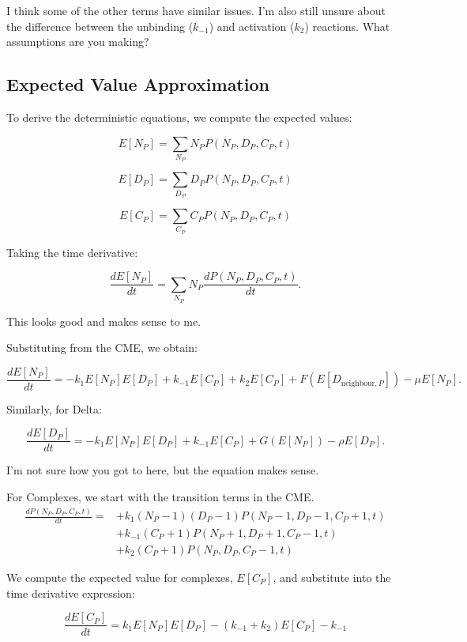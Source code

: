 \documentclass{article}
\begin{document}
\medskip

I think some of the other terms have similar issues. I'm also still unsure about the difference between the unbinding ($k_{-1}$) and activation ($k_{2}$) reactions. What assumptions are you making?

\color{black}


\subsection{Expected Value Approximation}
To derive the deterministic equations, we compute the expected values:

\[
E[N_P] = \sum_{N_P} N_P P(N_P, D_P, C_P, t)
\]

\[
E[D_P] = \sum_{D_P} D_P P(N_P, D_P, C_P, t)
\]

\[
E[C_P] = \sum_{C_P} C_P P(N_P, D_P, C_P, t)
\]

Taking the time derivative:

\[
\frac{dE[N_P]}{dt} = \sum_{N_P} N_P \frac{dP(N_P, D_P, C_P, t)}{dt}.
\]

\medskip
\color{red}
This looks good and makes sense to me.
\color{black}
\medskip

Substituting from the CME, we obtain:

\[
\frac{dE[N_P]}{dt} = -k_1 E[N_P]E[D_P] + k_{-1}E[C_P] + k_2 E[C_P] + F(E[D_{\text{neighbour},P}]) - \mu E[N_P].
\]

Similarly, for Delta:

\[
\frac{dE[D_P]}{dt} = -k_1 E[N_P]E[D_P] + k_{-1}E[C_P] + G(E[N_P]) - \rho E[D_P].
\]

\medskip
\color{red}
I'm not sure how you got to here, but the equation makes sense.
\color{black}
\medskip

For Complexes, we start with the transition terms in the CME.
\begin{align*}
\frac{dP(N_P, D_P, C_P, t)}{dt} = &+ 
 k_1 (N_P - 1)(D_P - 1) P(N_P - 1, D_P - 1, C_P + 1, t)\\
& + k_{-1} (C_P + 1) P(N_P + 1, D_P + 1, C_P - 1, t)\\
& + k_2 (C_P + 1) P(N_P, D_P, C_P - 1, t)
\end{align*}

We compute the expected value for complexes, \( E[C_P] \), and substitute into the time derivative expression:

\[
\frac{dE[C_P]}{dt} = k_1 E[N_P] E[D_P] - (k_{-1} + k_2) E[C_P] - k_{-1}
\]
\end{document}
